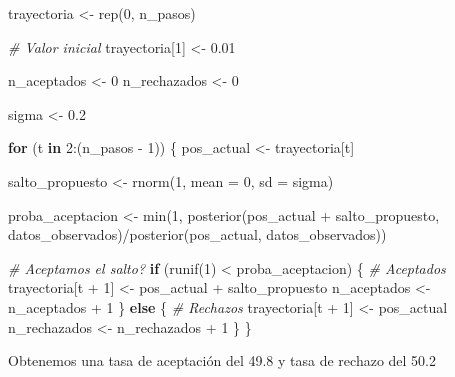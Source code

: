 \documentclass[
  12pt,
]{book}
\newenvironment{Shaded}{\begin{snugshade}}{\end{snugshade}}
\newcommand{\AttributeTok}[1]{\textcolor[rgb]{0.77,0.63,0.00}{#1}}
\newcommand{\CommentTok}[1]{\textcolor[rgb]{0.56,0.35,0.01}{\textit{#1}}}
\newcommand{\ControlFlowTok}[1]{\textcolor[rgb]{0.13,0.29,0.53}{\textbf{#1}}}
\newcommand{\DecValTok}[1]{\textcolor[rgb]{0.00,0.00,0.81}{#1}}
\newcommand{\FloatTok}[1]{\textcolor[rgb]{0.00,0.00,0.81}{#1}}
\newcommand{\FunctionTok}[1]{\textcolor[rgb]{0.00,0.00,0.00}{#1}}
\newcommand{\NormalTok}[1]{#1}
\newcommand{\OtherTok}[1]{\textcolor[rgb]{0.56,0.35,0.01}{#1}}
\newcommand{\SpecialCharTok}[1]{\textcolor[rgb]{0.00,0.00,0.00}{#1}}
\theoremstyle{definition}
\theoremstyle{definition}
\theoremstyle{definition}
\theoremstyle{definition}
\theoremstyle{remark}
\begin{document}
\begin{Shaded}
\begin{Highlighting}[]
\NormalTok{trayectoria }\OtherTok{\textless{}{-}} \FunctionTok{rep}\NormalTok{(}\DecValTok{0}\NormalTok{, n\_pasos)}

\CommentTok{\# Valor inicial}
\NormalTok{trayectoria[}\DecValTok{1}\NormalTok{] }\OtherTok{\textless{}{-}} \FloatTok{0.01}

\NormalTok{n\_aceptados }\OtherTok{\textless{}{-}} \DecValTok{0}
\NormalTok{n\_rechazados }\OtherTok{\textless{}{-}} \DecValTok{0}


\NormalTok{sigma }\OtherTok{\textless{}{-}} \FloatTok{0.2}

\ControlFlowTok{for}\NormalTok{ (t }\ControlFlowTok{in} \DecValTok{2}\SpecialCharTok{:}\NormalTok{(n\_pasos }\SpecialCharTok{{-}} \DecValTok{1}\NormalTok{)) \{}
\NormalTok{    pos\_actual }\OtherTok{\textless{}{-}}\NormalTok{ trayectoria[t]}

\NormalTok{    salto\_propuesto }\OtherTok{\textless{}{-}} \FunctionTok{rnorm}\NormalTok{(}\DecValTok{1}\NormalTok{, }\AttributeTok{mean =} \DecValTok{0}\NormalTok{, }\AttributeTok{sd =}\NormalTok{ sigma)}

\NormalTok{    proba\_aceptacion }\OtherTok{\textless{}{-}} \FunctionTok{min}\NormalTok{(}\DecValTok{1}\NormalTok{, }\FunctionTok{posterior}\NormalTok{(pos\_actual }\SpecialCharTok{+}
\NormalTok{        salto\_propuesto, datos\_observados)}\SpecialCharTok{/}\FunctionTok{posterior}\NormalTok{(pos\_actual,}
\NormalTok{        datos\_observados))}

    \CommentTok{\# Aceptamos el salto?}
    \ControlFlowTok{if}\NormalTok{ (}\FunctionTok{runif}\NormalTok{(}\DecValTok{1}\NormalTok{) }\SpecialCharTok{\textless{}}\NormalTok{ proba\_aceptacion) \{}
        \CommentTok{\# Aceptados}
\NormalTok{        trayectoria[t }\SpecialCharTok{+} \DecValTok{1}\NormalTok{] }\OtherTok{\textless{}{-}}\NormalTok{ pos\_actual }\SpecialCharTok{+}\NormalTok{ salto\_propuesto}
\NormalTok{        n\_aceptados }\OtherTok{\textless{}{-}}\NormalTok{ n\_aceptados }\SpecialCharTok{+} \DecValTok{1}
\NormalTok{    \} }\ControlFlowTok{else}\NormalTok{ \{}
        \CommentTok{\# Rechazos}
\NormalTok{        trayectoria[t }\SpecialCharTok{+} \DecValTok{1}\NormalTok{] }\OtherTok{\textless{}{-}}\NormalTok{ pos\_actual}
\NormalTok{        n\_rechazados }\OtherTok{\textless{}{-}}\NormalTok{ n\_rechazados }\SpecialCharTok{+} \DecValTok{1}
\NormalTok{    \}}
\NormalTok{\}}
\end{Highlighting}
\end{Shaded}

Obtenemos una tasa de aceptación del 49.8 y tasa de rechazo del 50.2
\end{document}
